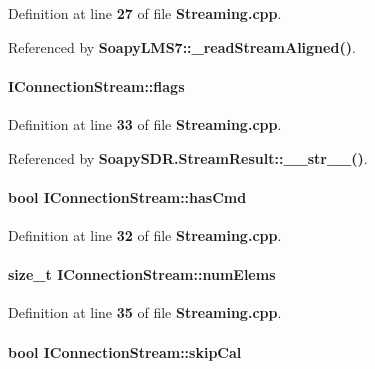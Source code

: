 Definition at line {\bf 27} of file {\bf Streaming.\+cpp}.



Referenced by {\bf Soapy\+L\+M\+S7\+::\+\_\+read\+Stream\+Aligned()}.

\paragraph[{flags}]{ I\+Connection\+Stream\+::flags}\label{structIConnectionStream_ad5749cb6bbbfafe8c4dc25569e455dcc}


Definition at line {\bf 33} of file {\bf Streaming.\+cpp}.



Referenced by {\bf Soapy\+S\+D\+R.\+Stream\+Result\+::\+\_\+\+\_\+str\+\_\+\+\_\+()}.

\paragraph[{has\+Cmd}]{\setlength{\rightskip}{0pt plus 5cm}bool I\+Connection\+Stream\+::has\+Cmd}\label{structIConnectionStream_a19e614052946e472698dc5698bb0e35b}


Definition at line {\bf 32} of file {\bf Streaming.\+cpp}.

\paragraph[{num\+Elems}]{\setlength{\rightskip}{0pt plus 5cm}size\+\_\+t I\+Connection\+Stream\+::num\+Elems}\label{structIConnectionStream_ac5909245367e55af04d5ab3d5aae20a1}


Definition at line {\bf 35} of file {\bf Streaming.\+cpp}.

\paragraph[{skip\+Cal}]{\setlength{\rightskip}{0pt plus 5cm}bool I\+Connection\+Stream\+::skip\+Cal}\label{structIConnectionStream_abc34e4ccf08165c5528e2b2502b5cf34}


